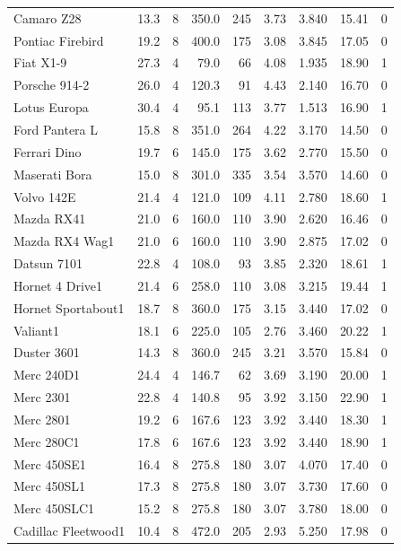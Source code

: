 \documentclass[a4paper, nobind]{templates/ociamthesis}
\begin{document}
\begin{longtable}{lrrrrrrrr}
Camaro Z28 & 13.3 & 8 & 350.0 & 245 & 3.73 & 3.840 & 15.41 & 0\\
Pontiac Firebird & 19.2 & 8 & 400.0 & 175 & 3.08 & 3.845 & 17.05 & 0\\
\addlinespace
Fiat X1-9 & 27.3 & 4 & 79.0 & 66 & 4.08 & 1.935 & 18.90 & 1\\
Porsche 914-2 & 26.0 & 4 & 120.3 & 91 & 4.43 & 2.140 & 16.70 & 0\\
Lotus Europa & 30.4 & 4 & 95.1 & 113 & 3.77 & 1.513 & 16.90 & 1\\
Ford Pantera L & 15.8 & 8 & 351.0 & 264 & 4.22 & 3.170 & 14.50 & 0\\
Ferrari Dino & 19.7 & 6 & 145.0 & 175 & 3.62 & 2.770 & 15.50 & 0\\
\addlinespace
Maserati Bora & 15.0 & 8 & 301.0 & 335 & 3.54 & 3.570 & 14.60 & 0\\
Volvo 142E & 21.4 & 4 & 121.0 & 109 & 4.11 & 2.780 & 18.60 & 1\\
Mazda RX41 & 21.0 & 6 & 160.0 & 110 & 3.90 & 2.620 & 16.46 & 0\\
Mazda RX4 Wag1 & 21.0 & 6 & 160.0 & 110 & 3.90 & 2.875 & 17.02 & 0\\
Datsun 7101 & 22.8 & 4 & 108.0 & 93 & 3.85 & 2.320 & 18.61 & 1\\
\addlinespace
Hornet 4 Drive1 & 21.4 & 6 & 258.0 & 110 & 3.08 & 3.215 & 19.44 & 1\\
Hornet Sportabout1 & 18.7 & 8 & 360.0 & 175 & 3.15 & 3.440 & 17.02 & 0\\
Valiant1 & 18.1 & 6 & 225.0 & 105 & 2.76 & 3.460 & 20.22 & 1\\
Duster 3601 & 14.3 & 8 & 360.0 & 245 & 3.21 & 3.570 & 15.84 & 0\\
Merc 240D1 & 24.4 & 4 & 146.7 & 62 & 3.69 & 3.190 & 20.00 & 1\\
\addlinespace
Merc 2301 & 22.8 & 4 & 140.8 & 95 & 3.92 & 3.150 & 22.90 & 1\\
Merc 2801 & 19.2 & 6 & 167.6 & 123 & 3.92 & 3.440 & 18.30 & 1\\
Merc 280C1 & 17.8 & 6 & 167.6 & 123 & 3.92 & 3.440 & 18.90 & 1\\
Merc 450SE1 & 16.4 & 8 & 275.8 & 180 & 3.07 & 4.070 & 17.40 & 0\\
Merc 450SL1 & 17.3 & 8 & 275.8 & 180 & 3.07 & 3.730 & 17.60 & 0\\
\addlinespace
Merc 450SLC1 & 15.2 & 8 & 275.8 & 180 & 3.07 & 3.780 & 18.00 & 0\\
Cadillac Fleetwood1 & 10.4 & 8 & 472.0 & 205 & 2.93 & 5.250 & 17.98 & 0\\

\end{longtable}
\end{document}
